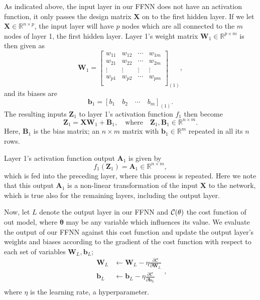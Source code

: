 \documentclass[]{article}
\begin{document}
As indicated above, the input layer in our FFNN does not have an activation function, it only passes the design matrix $\mathbf{X}$ on to the first hidden layer. If we let $\mathbf{X} \in \mathbb{R}^{n \times p}$, the input layer will have $p$ nodes which are all connected to the $m$ nodes of layer 1, the first hidden layer. Layer 1's weight matrix $\mathbf{W}_1 \in \mathbb{R}^{p \times m}$ is then given as
\begin{equation}
	\mathbf{W}_1 = 
	\left[\begin{array}{cccc}
		w_{11} &w_{12} & \cdots &w_{1m} \\
		w_{21} &w_{22} & \cdots &w_{2m} \\
		\vdots &\vdots &\vdots  &\vdots \\ 
		w_{p1} &w_{p2} & \cdots &w_{pm} \\
	\end{array} \right]_{(1)},
\end{equation} 
and its biases are
\begin{equation}
	\mathbf{b}_1 = [b_1 \quad b_2 \quad \cdots \quad b_m]_{(1)}.
\end{equation}
The resulting inputs $\mathbf{Z}_1$ to layer 1's activation function $f_1$ then become
\begin{equation} \label{inputs}
	\mathbf{Z}_1 = \mathbf{X} \mathbf{W}_1 + \mathbf{B}_1, \quad \text{where} \quad \mathbf{Z}_1, \mathbf{B}_1 \in \mathbb{R}^{n \times m}.
\end{equation}
Here, $\mathbf{B}_1$ is the bias matrix; an $n \times m$ matrix with $\mathbf{b}_1 \in \mathbb{R}^m$ repeated in all its $n$ rows.

Layer 1's activation function output $\mathbf{A}_1$ is given by
\begin{equation} \label{outputs}
	 f_1(\mathbf{Z}_1) = \mathbf{A}_1 \in \mathbb{R}^{n \times m},
\end{equation}
which is fed into the preceding layer, where this process is repeated. Here we note that this output $\mathbf{A}_1$ is a non-linear transformation of the input $\mathbf{X}$ to the network, which is true also for the remaining layers, including the output layer.

\vspace{5mm}

Now, let $L$ denote the output layer in our FFNN and $\cal{C}(\mathbf{\theta})$ the cost function of out model, where $\mathbf{\theta}$ may be any variable which influences its value. We evaluate the output of our FFNN against this cost function and update the output layer's weights and biases according to the gradient of the cost function with respect to each set of variables $\mathbf{W}_L, \mathbf{b}_L$;
\begin{equation} \label{wb-update}
\begin{aligned}
		\mathbf{W}_L &\leftarrow \mathbf{W}_L - \eta \frac{\partial \mathcal{C}}{\partial \mathbf{W}_L} \\
		\mathbf{b}_L &\leftarrow \mathbf{b}_L - \eta \frac{\partial \mathcal{C}}{\partial \mathbf{b}_L} \\
\end{aligned},
\end{equation}
where $\eta$ is the learning rate, a hyperparameter.
\end{document}
